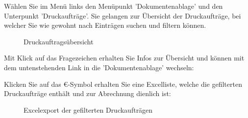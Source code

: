 Wählen Sie im Menü links den Menüpunkt 'Dokumentenablage' und den Unterpunkt 'Druckaufträge'. Sie gelangen zur Übersicht der Druckaufträge, bei welcher Sie wie gewohnt nach Einträgen suchen und filtern können.

\vspace{4cm} 

\begin{figure}[H]
\caption{Druckauftragsübersicht}
\end{figure}

Mit Klick auf das Fragezeichen  erhalten Sie Infos zur Übersicht und können mit dem untenstehenden Link in die 'Dokumentenablage' wechseln:

\begin{figure}[H]
\end{figure}

Klicken Sie auf das \euro{-Symbol}  erhalten Sie eine Excelliste, welche die gefilterten Druckaufträge enthält und zur Abrechnung dienlich ist:

\begin{figure}[H]
\caption{Excelexport der gefilterten Druckaufträgen}
\end{figure}

